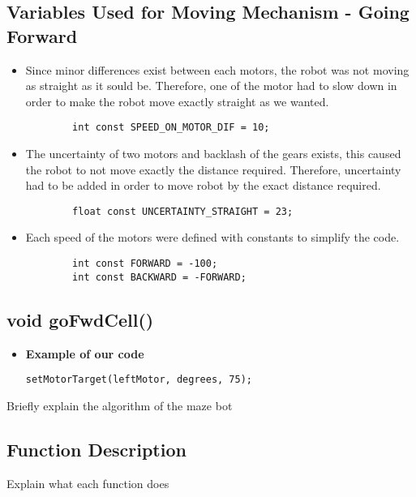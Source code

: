\documentclass[11pt]{article}
\begin{document}
\subsection{Variables Used for Moving Mechanism - Going Forward}
\begin{itemize}
\item Since minor differences exist between each motors, the robot was not moving as straight as it sould be. Therefore, one of the motor had to slow down in order to make the robot move exactly straight as we wanted.
	\begin{verbatim}
		int const SPEED_ON_MOTOR_DIF = 10;
	\end{verbatim} 
\item The uncertainty of two motors and backlash of the gears exists, this caused the robot to not move exactly the distance required. Therefore, uncertainty had to be added in order to move robot by the exact distance required. 
	\begin{verbatim}
		float const UNCERTAINTY_STRAIGHT = 23;
	\end{verbatim} 
\item Each speed of the motors were defined with constants to simplify the code. 
	\begin{verbatim}
		int const FORWARD = -100;
		int const BACKWARD = -FORWARD;
	\end{verbatim} 
\end{itemize}

\newpage





\subsection{void goFwdCell()}
\begin{itemize}
\item \textbf{Example of our code}
\begin{verbatim}
setMotorTarget(leftMotor, degrees, 75);
\end{verbatim}
\end{itemize}


Briefly explain the algorithm of the maze bot 

\subsection{Function Description}

Explain what each function does 
\end{document}
